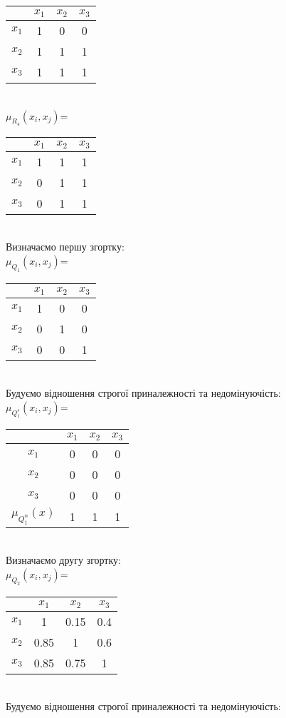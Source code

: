 \begin{exs}
\begin{tabular}{c|c|c|c}
 & $x_1$ & $x_2$ & $x_3$ \\ 
\hline 
$x_1$ & 1 & 0 & 0 \\ 
\hline 
$x_2$ & 1 & 1 & 1 \\ 
\hline 
$x_3$ & 1 & 1 & 1 \\ 
\end{tabular} \\
$\mu_{R_4}(x_i,x_j)$=\begin{tabular}{c|c|c|c}
 & $x_1$ & $x_2$ & $x_3$ \\ 
\hline 
$x_1$ & 1 & 1 & 1 \\ 
\hline 
$x_2$ & 0 & 1 & 1 \\ 
\hline 
$x_3$ & 0 & 1 & 1 \\ 
\end{tabular} \\
Визначаємо першу згортку:\\
$\mu_{Q_1}(x_i,x_j)$=\begin{tabular}{c|c|c|c}
 & $x_1$ & $x_2$ & $x_3$ \\ 
\hline 
$x_1$ & 1 & 0 &  0\\ 
\hline 
$x_2$ &  0& 1 & 0 \\ 
\hline 
$x_3$ &  0& 0 & 1 \\ 
\end{tabular} \\
Будуємо відношення строгої приналежності та недомінуючість:\\
$\mu_{Q_1^s}(x_i,x_j)$=\begin{tabular}{c|c|c|c}
 & $x_1$ & $x_2$ & $x_3$ \\ 
\hline 
$x_1$ & 0 &0  &0  \\ 
\hline 
$x_2$ &0  & 0 &0  \\ 
\hline 
$x_3$ &0  &0  & 0 \\ 
\hline
$\mu_{Q_1^n}(x)$ & 1 & 1 &1 \\
\end{tabular} \\
Визначаємо другу згортку:\\
$\mu_{Q_2}(x_i,x_j)$=\begin{tabular}{c|c|c|c}
 & $x_1$ & $x_2$ & $x_3$ \\ 
\hline 
$x_1$ & 1 & 0.15  &0.4  \\ 
\hline 
$x_2$ & 0.85 & 1 & 0.6  \\ 
\hline 
$x_3$ & 0.85 & 0.75 & 1 \\ 
\end{tabular} \\
Будуємо відношення строгої приналежності та недомінуючість:\\

\end{exs}
